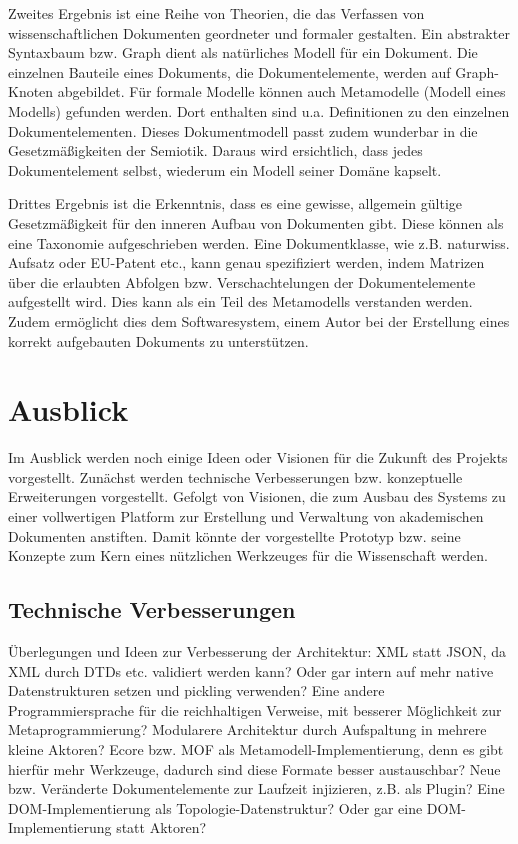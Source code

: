  
Zweites Ergebnis ist eine Reihe von Theorien, die das Verfassen von wissenschaftlichen Dokumenten geordneter und formaler gestalten. Ein abstrakter Syntaxbaum bzw. Graph dient als natürliches Modell für ein Dokument. Die einzelnen Bauteile eines Dokuments, die Dokumentelemente, werden auf Graph-Knoten abgebildet. Für formale Modelle können auch Metamodelle (Modell eines Modells) gefunden werden. Dort enthalten sind u.a. Definitionen zu den einzelnen Dokumentelementen. Dieses Dokumentmodell passt zudem wunderbar in die Gesetzmäßigkeiten der Semiotik. Daraus wird ersichtlich, dass jedes Dokumentelement selbst, wiederum ein Modell seiner Domäne kapselt.

 
Drittes Ergebnis ist die Erkenntnis, dass es eine gewisse, allgemein gültige Gesetzmäßigkeit für den inneren Aufbau von Dokumenten gibt. Diese können als eine Taxonomie aufgeschrieben werden. Eine Dokumentklasse, wie z.B. naturwiss. Aufsatz oder EU-Patent etc., kann genau spezifiziert werden, indem Matrizen über die erlaubten Abfolgen bzw. Verschachtelungen der Dokumentelemente aufgestellt wird. Dies kann als ein Teil des Metamodells verstanden werden. Zudem ermöglicht dies dem Softwaresystem, einem Autor bei der Erstellung eines korrekt aufgebauten Dokuments zu unterstützen.

 
\section{Ausblick}\label{}
 
Im Ausblick werden noch einige Ideen oder Visionen für die Zukunft des Projekts vorgestellt. Zunächst werden technische Verbesserungen bzw. konzeptuelle Erweiterungen vorgestellt. Gefolgt von Visionen, die zum Ausbau des Systems zu einer vollwertigen Platform zur Erstellung und Verwaltung von akademischen Dokumenten anstiften. Damit könnte der vorgestellte Prototyp bzw. seine Konzepte zum Kern eines nützlichen Werkzeuges für die Wissenschaft werden.

 
\subsection{Technische Verbesserungen}\label{}
 
Überlegungen und Ideen zur Verbesserung der Architektur: XML statt JSON, da XML durch DTDs etc. validiert werden kann? Oder gar intern auf mehr native Datenstrukturen setzen und pickling verwenden? Eine andere Programmiersprache für die reichhaltigen Verweise, mit besserer Möglichkeit zur Metaprogrammierung? Modularere Architektur durch Aufspaltung in mehrere kleine Aktoren? Ecore bzw. MOF als Metamodell-Implementierung, denn es gibt hierfür mehr Werkzeuge, dadurch sind diese Formate besser austauschbar? Neue bzw. Veränderte Dokumentelemente zur Laufzeit injizieren, z.B. als Plugin? Eine DOM-Implementierung als Topologie-Datenstruktur? Oder gar eine DOM-Implementierung statt Aktoren?

